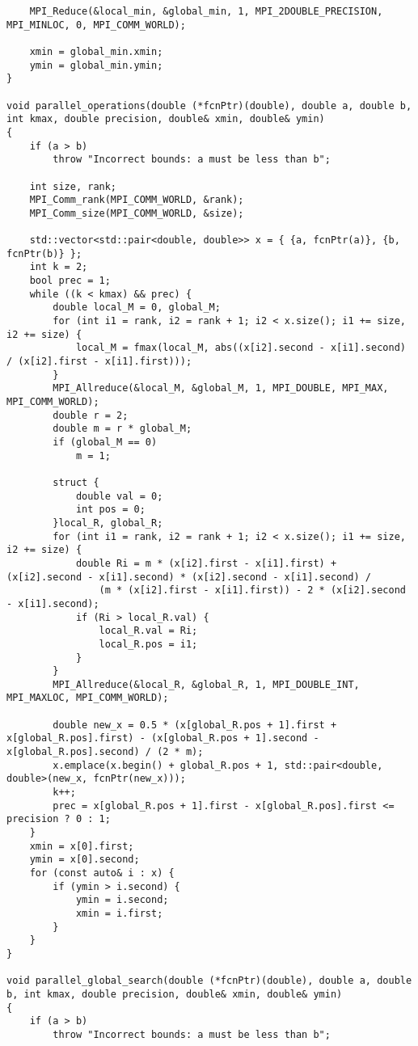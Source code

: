 \documentclass{report}
\begin{document}
\begin{lstlisting}
    MPI_Reduce(&local_min, &global_min, 1, MPI_2DOUBLE_PRECISION, MPI_MINLOC, 0, MPI_COMM_WORLD);

    xmin = global_min.xmin;
    ymin = global_min.ymin;
}

void parallel_operations(double (*fcnPtr)(double), double a, double b, int kmax, double precision, double& xmin, double& ymin)
{
    if (a > b)
        throw "Incorrect bounds: a must be less than b";

    int size, rank;
    MPI_Comm_rank(MPI_COMM_WORLD, &rank);
    MPI_Comm_size(MPI_COMM_WORLD, &size);

    std::vector<std::pair<double, double>> x = { {a, fcnPtr(a)}, {b, fcnPtr(b)} };
    int k = 2;
    bool prec = 1;
    while ((k < kmax) && prec) {
        double local_M = 0, global_M;
        for (int i1 = rank, i2 = rank + 1; i2 < x.size(); i1 += size, i2 += size) {
            local_M = fmax(local_M, abs((x[i2].second - x[i1].second) / (x[i2].first - x[i1].first)));
        }
        MPI_Allreduce(&local_M, &global_M, 1, MPI_DOUBLE, MPI_MAX, MPI_COMM_WORLD);
        double r = 2;
        double m = r * global_M;
        if (global_M == 0)
            m = 1;

        struct {
            double val = 0;
            int pos = 0;
        }local_R, global_R;
        for (int i1 = rank, i2 = rank + 1; i2 < x.size(); i1 += size, i2 += size) {
            double Ri = m * (x[i2].first - x[i1].first) + (x[i2].second - x[i1].second) * (x[i2].second - x[i1].second) /
                (m * (x[i2].first - x[i1].first)) - 2 * (x[i2].second - x[i1].second);
            if (Ri > local_R.val) {
                local_R.val = Ri;
                local_R.pos = i1;
            }
        }
        MPI_Allreduce(&local_R, &global_R, 1, MPI_DOUBLE_INT, MPI_MAXLOC, MPI_COMM_WORLD);

        double new_x = 0.5 * (x[global_R.pos + 1].first + x[global_R.pos].first) - (x[global_R.pos + 1].second - x[global_R.pos].second) / (2 * m);
        x.emplace(x.begin() + global_R.pos + 1, std::pair<double, double>(new_x, fcnPtr(new_x)));
        k++;
        prec = x[global_R.pos + 1].first - x[global_R.pos].first <= precision ? 0 : 1;
    }
    xmin = x[0].first;
    ymin = x[0].second;
    for (const auto& i : x) {
        if (ymin > i.second) {
            ymin = i.second;
            xmin = i.first;
        }
    }
}

void parallel_global_search(double (*fcnPtr)(double), double a, double b, int kmax, double precision, double& xmin, double& ymin)
{
    if (a > b)
        throw "Incorrect bounds: a must be less than b";


\end{lstlisting}
\end{document}
